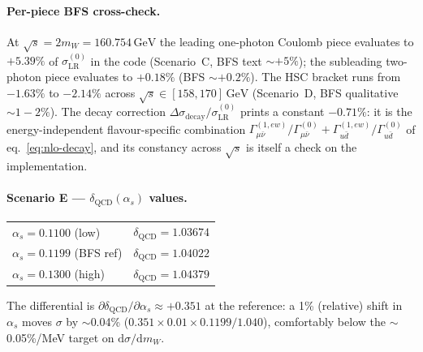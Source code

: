 \documentclass[11pt,a4paper]{article}
\newcommand{\mW}{m_W}
\newcommand{\sqrts}{\sqrt{s}}
\newcommand{\GeV}{\ensuremath{\,\mathrm{GeV}}}
\begin{document}
\paragraph{Per-piece BFS cross-check.} At $\sqrts=2\mW=160.754\GeV$
the leading one-photon Coulomb piece evaluates to ${+}5.39\%$ of
$\sigma_\mathrm{LR}^{(0)}$ in the code (Scenario~C, BFS text
${\sim}{+}5\%$); the subleading two-photon piece evaluates to
${+}0.18\%$ (BFS ${\sim}{+}0.2\%$). The HSC bracket runs from
${-}1.63\%$ to ${-}2.14\%$ across $\sqrts\in[158,170]\GeV$
(Scenario~D, BFS qualitative ${\sim}1{-}2\%$). The decay correction
$\Delta\sigma_\mathrm{decay}/\sigma_\mathrm{LR}^{(0)}$ prints a
constant ${-}0.71\%$: it is the energy-independent flavour-specific
combination $\Gamma^{(1,ew)}_{\mu\bar\nu}/\Gamma_{\mu\bar\nu}^{(0)}+
\Gamma_{u\bar d}^{(1,ew)}/\Gamma_{u\bar d}^{(0)}$ of
eq.~\eqref{eq:nlo-decay}, and its constancy across $\sqrts$ is itself a
check on the implementation.

\paragraph{Scenario E — $\delta_\mathrm{QCD}(\alpha_s)$ values.}
\begin{tabular}{l l}
$\alpha_s = 0.1100$ (low)   & $\delta_\mathrm{QCD} = 1.03674$ \\
$\alpha_s = 0.1199$ (BFS ref) & $\delta_\mathrm{QCD} = 1.04022$ \\
$\alpha_s = 0.1300$ (high)  & $\delta_\mathrm{QCD} = 1.04379$ \\
\end{tabular}

\noindent The differential is $\partial\delta_\mathrm{QCD}/\partial\alpha_s
\approx +0.351$ at the reference: a 1\% (relative) shift in $\alpha_s$ moves
$\sigma$ by $\sim$0.04\% ($0.351\times0.01\times0.1199/1.040$), comfortably
below the $\sim$0.05\%/MeV target on $\mathrm{d}\sigma/\mathrm{d}\mW$.
\end{document}
